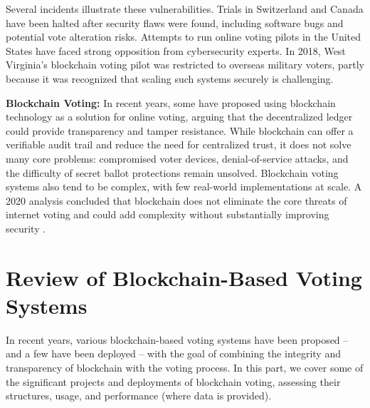 \documentclass[a4paper,10pt]{report}
\begin{document}
Several incidents illustrate these vulnerabilities. Trials in Switzerland and Canada have been halted after security flaws were found, including software bugs and potential vote alteration risks. Attempts to run online voting pilots in the United States have faced strong opposition from cybersecurity experts. In 2018, West Virginia’s blockchain voting pilot was restricted to overseas military voters, partly because it was recognized that scaling such systems securely is challenging.

\textbf {Blockchain Voting:} In recent years, some have proposed using blockchain technology as a solution for online voting, arguing that the decentralized ledger could provide transparency and tamper resistance. While blockchain can offer a verifiable audit trail and reduce the need for centralized trust, it does not solve many core problems: compromised voter devices, denial-of-service attacks, and the difficulty of secret ballot protections remain unsolved. Blockchain voting systems also tend to be complex, with few real-world implementations at scale. A 2020 analysis concluded that blockchain does not eliminate the core threats of internet voting and could add complexity without substantially improving security \cite{grimsby2020}.

\section{Review of Blockchain-Based Voting Systems}

In recent years, various blockchain-based voting systems have been proposed -- and a few have been deployed -- with the goal of combining the integrity and transparency of blockchain with the voting process.  In this part, we cover some of the significant projects and deployments of blockchain voting, assessing their structures, usage, and performance (where data is provided).
\end{document}
